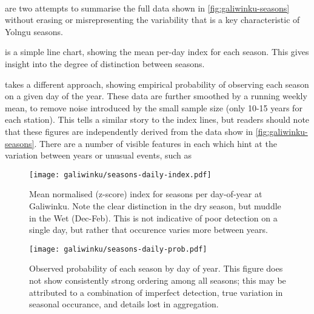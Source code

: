 ~\\


 are two attempts to
summarise the full data shown in \cref{fig:galiwinku-seasons} without
erasing or misrepresenting the variability that is a key characteristic
of Yolngu seasons.

 is a simple line chart, showing the mean
per-day index for each season.
%
This gives insight into the degree of distinction between seasons.


 takes a different approach, showing empirical
probability of observing each season on a given day of the year.  These
data are further smoothed by a running weekly mean, to remove noise
introduced by the small sample size (only 10-15 years for each station).
%
This tells a similar story to the index lines, but readers should note
that these figures are independently derived from the data show in
\cref{fig:galiwinku-seasons}.  There are a number of visible features in
each which hint at the variation between years or unusual events, such as
%



\begin{figure}[h]
    \centering
    \texttt{[image: galiwinku/seasons-daily-index.pdf]}
    \caption[Season index by day-of-year, Elcho Island]{
        Mean normalised (z-score) index for seasons per day-of-year
        at Galiwinku.  Note the clear distinction in the dry season,
        but muddle in the Wet (Dec-Feb).
        This is not indicative of poor detection on a single day,
        but rather that occurence varies more between years.
        }
    \label{fig:season-daily-index}
\end{figure}
\begin{figure}[h]
    \centering
    \texttt{[image: galiwinku/seasons-daily-prob.pdf]}
    \caption[Season probability by day-of-year, Elcho Island]{
        Observed probability of each season by day of year.
        This figure does not show consistently strong ordering among all
        seasons; this may be attributed to a combination of imperfect
        detection, true variation in seasonal occurance, and details
        lost in aggregation.
        }
    \label{fig:season-daily-prob}
\end{figure}



